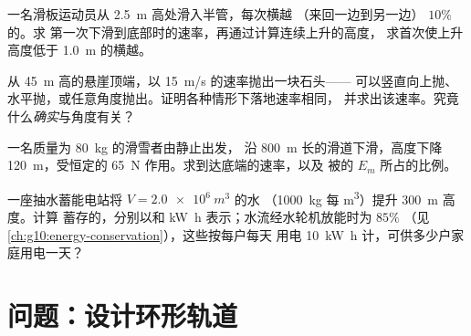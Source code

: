 \begin{exercise}[$\star\star\star$]\label{exo:g11:mechanical-energy:12}
一名滑板运动员从 \qty{2.5}{m} 高处滑入半管，每次横越
（来回一边到另一边） $10\%$ 的。求
第一次下滑到底部时的速率，再通过计算连续上升的高度，
求首次使上升高度低于 \qty{1.0}{m} 的横越。
\end{exercise}

\begin{exercise}[$\star\star\star$]\label{exo:g11:mechanical-energy:13}
从 \qty{45}{m} 高的悬崖顶端，以 \qty{15}{m/s} 的速率抛出一块石头——
可以竖直向上抛、水平抛，或任意角度抛出。证明各种情形下落地速率相同，
并求出该速率。究竟什么\emph{确实}与角度有关？
\end{exercise}

\begin{exercise}[$\star\star\star$]\label{exo:g11:mechanical-energy:14}
一名质量为 \qty{80}{kg} 的滑雪者由静止出发，
沿 \qty{800}{m} 长的滑道下滑，高度下降 \qty{120}{m}，受恒定的 \qty{65}{N}
作用。求到达底端的速率，以及
被的 $E_m$ 所占的比例。
\end{exercise}

\begin{exercise}[$\star\star\star$]\label{exo:g11:mechanical-energy:15}
一座抽水蓄能电站将 $V = \qty{2.0e6}{m^3}$ 的水
（\qty{1000}{kg} 每 \unit{m^3}）提升 \qty{300}{m} 高度。计算
蓄存的，分别以和 \unit{kW.h} 表示；水流经水轮机放能时为 $85\%$
（见\cref{ch:g10:energy-conservation}），这些按每户每天
用电 \qty{10}{kW.h} 计，可供多少户家庭用电一天？
\end{exercise}

\section{问题：设计环形轨道}

